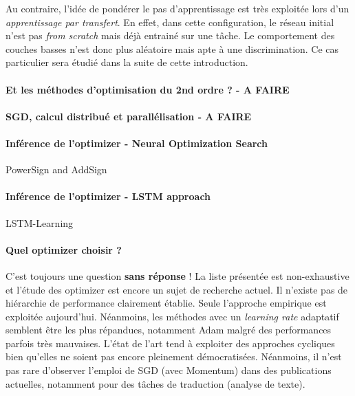\noindent Au contraire, l'idée de pondérer le pas d'apprentissage est très exploitée lors d'un \textit{apprentissage par transfert}. En effet, dans cette configuration, le réseau initial n'est pas \textit{from scratch} mais déjà entrainé sur une tâche. Le comportement des couches basses n'est donc plus aléatoire mais apte à une discrimination. Ce cas particulier sera étudié dans la suite de cette introduction.


\paragraph{Et les méthodes d'optimisation du 2nd ordre ? - A FAIRE}

\paragraph{SGD, calcul distribué et parallélisation - A FAIRE}

\paragraph{Inférence de l'optimizer - Neural Optimization Search}
PowerSign and AddSign \cite{learninggrad2}

\paragraph{Inférence de l'optimizer - LSTM approach}
LSTM-Learning\cite{learninggrad}

\paragraph{Quel optimizer choisir ?}

\noindent C'est toujours une question \textbf{sans réponse} ! La liste présentée est non-exhaustive et l'étude des optimizer est encore un sujet de recherche actuel. Il n'existe pas de hiérarchie de performance clairement établie. Seule l'approche empirique est exploitée aujourd'hui. Néanmoins, les méthodes avec un \textit{learning rate} adaptatif semblent être les plus répandues, notamment Adam malgré des performances parfois très mauvaises. L'état de l'art tend à exploiter des approches cycliques bien qu'elles ne soient pas encore pleinement démocratisées. Néanmoins, il n'est pas rare d'observer l'emploi de SGD (avec Momentum) dans des publications actuelles, notamment pour des tâches de traduction (analyse de texte).\\

